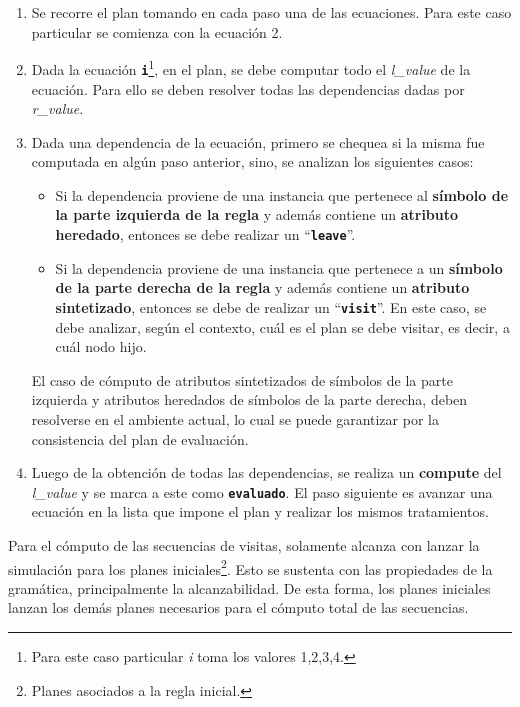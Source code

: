 \documentclass[runningheads,a4paper]{llncs}
\newcommand{\textbtt}[1]{\texttt{\textbf{#1}}}
\begin{document}
\begin{enumerate}
\item Se recorre el plan tomando en cada paso una de las ecuaciones. Para este caso particular se comienza con la ecuación 2.

\item Dada la ecuación \textbtt{i}\footnote{Para este caso particular \textit{i} toma los valores 1,2,3,4.}, en el plan, se debe computar todo el \textit{l\_value} de la ecuación. Para ello se deben resolver todas las dependencias dadas por \textit{r\_value}.

\item Dada una dependencia de la ecuación, primero se chequea si la misma fue computada en algún paso anterior, sino, se analizan los siguientes casos:

\begin{itemize}
\item Si la dependencia proviene de una instancia que pertenece al \textbf{símbolo de la parte izquierda de la regla} y además contiene un \textbf{atributo heredado}, entonces se debe realizar un ``\textbtt{leave}''.

\item Si la dependencia proviene de una instancia que pertenece a un \textbf{símbolo de la parte derecha de la regla} y además contiene un \textbf{atributo sintetizado}, entonces se debe de realizar un ``\textbtt{visit}''. En este caso, se debe analizar, según el contexto, cuál es el plan se debe visitar, es decir, a cuál nodo hijo. 
\end{itemize}

El caso de cómputo de atributos sintetizados de símbolos de la parte izquierda y atributos heredados de símbolos de la parte derecha, deben resolverse en el ambiente actual, lo cual se puede garantizar por la consistencia del plan de evaluación.

\item Luego de la obtención de todas las dependencias, se realiza un \textbf{compute} del \textit{l\_value} y se marca a este como \textbtt{evaluado}. El paso siguiente es avanzar una ecuación en la lista que impone el plan y realizar los mismos tratamientos.
\end{enumerate}

Para el cómputo de las secuencias de visitas, solamente alcanza con lanzar la simulación para los planes iniciales\footnote{Planes asociados a la regla inicial.}. Esto se sustenta con las propiedades de la gramática, principalmente la alcanzabilidad. De esta forma, los planes iniciales lanzan los demás planes necesarios para el cómputo total de las secuencias.
\end{document}
